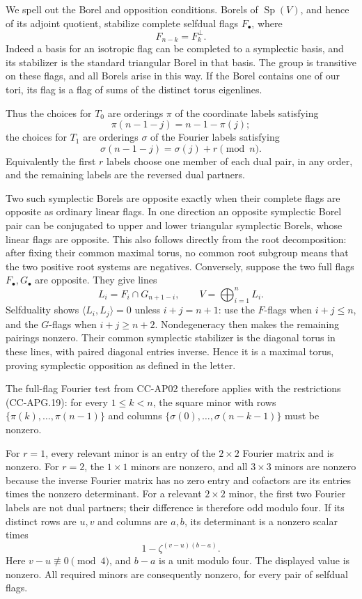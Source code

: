 \documentclass[11pt,a4paper]{article}
\theoremstyle{definition}\newtheorem{definition}[theorem]{Definition}
\theoremstyle{remark}\newtheorem{remark}[theorem]{Remark}
\begin{document}
We spell out the Borel and opposition conditions. Borels of
\(\operatorname{Sp}(V)\), and hence of its adjoint quotient, stabilize
complete selfdual flags \(F_\bullet\), where \[
 F_{n-k}=F_k^\perp.
\] Indeed a basis for an isotropic flag can be completed to a symplectic
basis, and its stabilizer is the standard triangular Borel in that
basis. The group is transitive on these flags, and all Borels arise in
this way. If the Borel contains one of our tori, its flag is a flag of
sums of the distinct torus eigenlines.

Thus the choices for \(T_0\) are orderings \(\pi\) of the coordinate
labels satisfying \[
 \pi(n-1-j)=n-1-\pi(j);
\] the choices for \(T_1\) are orderings \(\sigma\) of the Fourier
labels satisfying \[
 \sigma(n-1-j)=\sigma(j)+r\pmod n.
 \tag{CC-APG.19}
\] Equivalently the first \(r\) labels choose one member of each dual
pair, in any order, and the remaining labels are the reversed dual
partners.

Two such symplectic Borels are opposite exactly when their complete
flags are opposite as ordinary linear flags. In one direction an
opposite symplectic Borel pair can be conjugated to upper and lower
triangular symplectic Borels, whose linear flags are opposite. This also
follows directly from the root decomposition: after fixing their common
maximal torus, no common root subgroup means that the two positive root
systems are negatives. Conversely, suppose the two full flags
\(F_\bullet,G_\bullet\) are opposite. They give lines \[
 L_i=F_i\cap G_{n+1-i},\qquad
 V=\bigoplus_{i=1}^n L_i.
\] Selfduality shows \(\langle L_i,L_j\rangle=0\) unless \(i+j=n+1\):
use the \(F\)-flags when \(i+j\leq n\), and the \(G\)-flags when
\(i+j\geq n+2\). Nondegeneracy then makes the remaining pairings
nonzero. Their common symplectic stabilizer is the diagonal torus in
these lines, with paired diagonal entries inverse. Hence it is a maximal
torus, proving symplectic opposition as defined in the letter.

The full-flag Fourier test from CC-AP02 therefore applies with the
restrictions (CC-APG.19): for every \(1\leq k<n\), the square minor with
rows \(\{\pi(k),\ldots,\pi(n-1)\}\) and columns
\(\{\sigma(0),\ldots,\sigma(n-k-1)\}\) must be nonzero.

For \(r=1\), every relevant minor is an entry of the \(2\times2\)
Fourier matrix and is nonzero. For \(r=2\), the \(1\times1\) minors are
nonzero, and all \(3\times3\) minors are nonzero because the inverse
Fourier matrix has no zero entry and cofactors are its entries times the
nonzero determinant. For a relevant \(2\times2\) minor, the first two
Fourier labels are not dual partners; their difference is therefore odd
modulo four. If its distinct rows are \(u,v\) and columns are \(a,b\),
its determinant is a nonzero scalar times \[
 1-\zeta^{(v-u)(b-a)}.
\] Here \(v-u\not\equiv0\pmod4\), and \(b-a\) is a unit modulo four. The
displayed value is nonzero. All required minors are consequently
nonzero, for every pair of selfdual flags.
\end{document}
